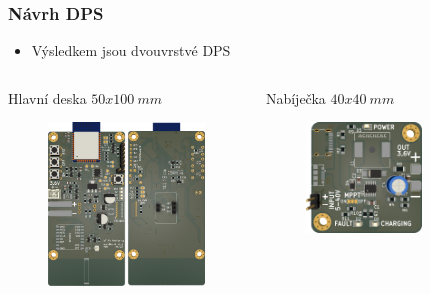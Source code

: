 \documentclass[%
  12pt,       				%
	t,                  %
	aspectratio=1610,   %
	unicode,						%
]{beamer}				    	%
\begin{document}
\begin{frame}
	\frametitle{Návrh DPS}
	\begin{itemize}
		\item Výsledkem jsou dvouvrstvé DPS
	\end{itemize}
	\begin{columns}
		\begin{column}{0.5\textwidth}
			\centering
			Hlavní deska $50x100~mm$
			\begin{figure}
				\centering
				\includegraphics[height=0.65\textheight]{obrazky/mainBoard-kicad.png}
			\end{figure}
		\end{column}

		\begin{column}{0.5\textwidth}
			\centering
			Nabíječka $40x40~mm$
			\begin{figure}
				\centering
				\vspace{3ex}
				\includegraphics[width=0.7\textwidth]{obrazky/batteryCharger-top_.png}
			\end{figure}


\end{column}
\end{columns}
\end{frame}
\end{document}
